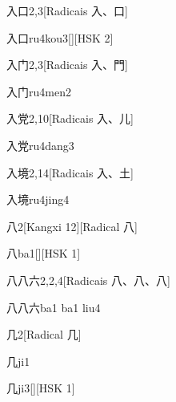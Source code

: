 \begin{entry}{入口}{2,3}[Radicais ⼊、⼝]
  \begin{phonetics}{入口}{ru4kou3}[][HSK 2]
  \end{phonetics}
\end{entry}

\begin{entry}{入门}{2,3}[Radicais ⼊、⾨]
  \begin{phonetics}{入门}{ru4men2}
  \end{phonetics}
\end{entry}

\begin{entry}{入党}{2,10}[Radicais ⼊、⼉]
  \begin{phonetics}{入党}{ru4dang3}
  \end{phonetics}
\end{entry}

\begin{entry}{入境}{2,14}[Radicais ⼊、⼟]
  \begin{phonetics}{入境}{ru4jing4}
  \end{phonetics}
\end{entry}

\begin{entry}{八}{2}[Kangxi 12][Radical ⼋]
  \begin{phonetics}{八}{ba1}[][HSK 1]
  \end{phonetics}
\end{entry}

\begin{entry}{八八六}{2,2,4}[Radicais ⼋、⼋、⼋]
  \begin{phonetics}{八八六}{ba1 ba1 liu4}
  \end{phonetics}
\end{entry}

\begin{entry}{几}{2}[Radical ⼏]
  \begin{phonetics}{几}{ji1}
  \end{phonetics}
  \begin{phonetics}{几}{ji3}[][HSK 1]
  \end{phonetics}
\end{entry}

